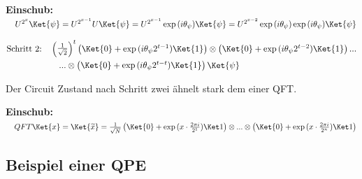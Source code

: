 \hr

\textbf{Einschub:}
\(\quad U^{2^x}\Ket{\psi} = U^{2^{x-1}}U\Ket{\psi} =  U^{2^{x-1}}\exp{(i\theta_\psi)}\Ket{\psi} = U^{2^{x-2}}\exp{(i\theta_\psi)}\exp{(i\theta_\psi)}\Ket{\psi}\)
\hr


\begin{align*}
    \text{Schritt 2:}\quad & \begin{pmatrix}
                                 \frac{1}{\sqrt{2}}\end{pmatrix}^t \begin{pmatrix} \Ket{0} + \exp{(i\theta_\psi2^{t-1})}\Ket{1} \end{pmatrix} \otimes \begin{pmatrix} \Ket{0} + \exp{(i\theta_\psi2^{t-2})}\Ket{1} \end{pmatrix} ... \\
                           & \quad...\otimes \begin{pmatrix} \Ket{0} + \exp{(i\theta_\psi2^{t-t})}\Ket{1} \end{pmatrix}
    \Ket{\psi}
\end{align*}


Der Circuit Zustand nach Schritt zwei ähnelt stark dem einer QFT. \newline \newline

\hr
\textbf{Einschub:}
\(\quad QFT\Ket{x} = \Ket{\widetilde{x}} = \frac{1}{\sqrt{N}}
\begin{pmatrix}\Ket{0} + \exp{(x\cdot\frac{2\pi i}{2^1})} \Ket1\end{pmatrix} \otimes ... \otimes \begin{pmatrix}\Ket{0} + \exp{(x\cdot\frac{2\pi i}{2^n})} \Ket1\end{pmatrix}\)
\hr

\newline
\subsection{Beispiel einer QPE}
\newline

